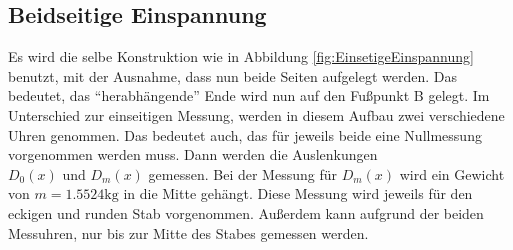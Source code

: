 \subsection{Beidseitige Einspannung}
\label{sec:BeidseitigeEinspannung}

Es wird die selbe Konstruktion wie in Abbildung \ref{fig:EinsetigeEinspannung} benutzt, mit der Ausnahme, dass nun beide Seiten aufgelegt werden.
Das bedeutet, das \enquote{herabhängende} Ende wird nun auf den Fußpunkt B gelegt.
Im Unterschied zur einseitigen Messung, werden in diesem Aufbau zwei verschiedene Uhren genommen.
Das bedeutet auch, das für jeweils beide eine Nullmessung vorgenommen werden muss.
Dann werden die Auslenkungen $D_0 (x) \text{ und } D_m (x)$ gemessen.
Bei der Messung für $D_m (x)$ wird ein Gewicht von $m = 1.5524 \unit{\kilo\gram}$ in die Mitte gehängt.
Diese Messung wird jeweils für den eckigen und runden Stab vorgenommen.
Außerdem kann aufgrund der beiden Messuhren, nur bis zur Mitte des Stabes gemessen werden.